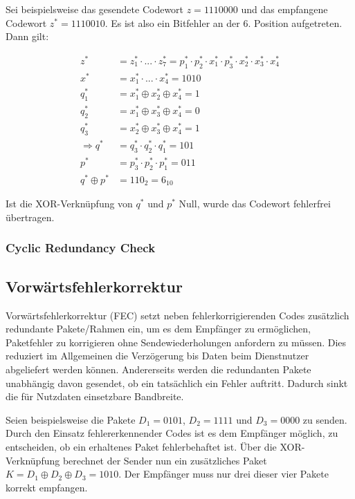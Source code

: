 \documentclass[a4paper, 14pt]{article}
\begin{document}
	Sei beispielsweise das gesendete Codewort $z = 1110000$ und das empfangene Codewort $z^* = 1110010$.
	Es ist also ein Bitfehler an der 6. Position aufgetreten.
	Dann gilt:

	\begin{align*}
		z^* &= z^*_1 \cdot ... \cdot z^*_7 = p^*_1 \cdot p^*_2 \cdot x^*_1 \cdot p^*_3 \cdot x^*_2 \cdot x^*_3 \cdot x^*_4 \\
		x^* &= x^*_1 \cdot ... \cdot x^*_4 = 1010 \\
		q^*_1 &= x^*_1 \oplus x^*_2 \oplus x^*_4 = 1 \\
		q^*_2 &= x^*_1 \oplus x^*_3 \oplus x^*_4 = 0 \\
		q^*_3 &= x^*_2 \oplus x^*_3 \oplus x^*_4 = 1 \\
		\Rightarrow q^* &= q^*_3 \cdot q^*_2 \cdot q^*_1 = 101 \\
		p^* &= p^*_3 \cdot p^*_2 \cdot p^*_1 = 011 \\
		q^* \oplus p^* &= 110_2 = 6_{10}
	\end{align*}

	Ist die XOR-Verknüpfung von $q^*$ und $p^*$ Null, wurde das Codewort fehlerfrei übertragen.

	\subsubsection{Cyclic Redundancy Check}


	\subsection{Vorwärtsfehlerkorrektur}

	Vorwärtsfehlerkorrektur (FEC) setzt neben fehlerkorrigierenden Codes zusätzlich redundante Pakete/Rahmen ein, um es dem Empfänger zu ermöglichen, Paketfehler zu korrigieren ohne Sendewiederholungen anfordern zu müssen.
	Dies reduziert im Allgemeinen die Verzögerung bis Daten beim Dienstnutzer abgeliefert werden können.
	Andererseits werden die redundanten Pakete unabhängig davon gesendet, ob ein tatsächlich ein Fehler auftritt.
	Dadurch sinkt die für Nutzdaten einsetzbare Bandbreite.

	Seien beispielsweise die Pakete $D_1 = 0101$, $D_2 = 1111$ und $D_3 = 0000$ zu senden.
	Durch den Einsatz fehlererkennender Codes ist es dem Empfänger möglich, zu entscheiden, ob ein erhaltenes Paket fehlerbehaftet ist.
	Über die XOR-Verknüpfung berechnet der Sender nun ein zusätzliches Paket $K = D_1 \oplus D_2 \oplus D_3 = 1010$.
	Der Empfänger muss nur drei dieser vier Pakete korrekt empfangen.
\end{document}
